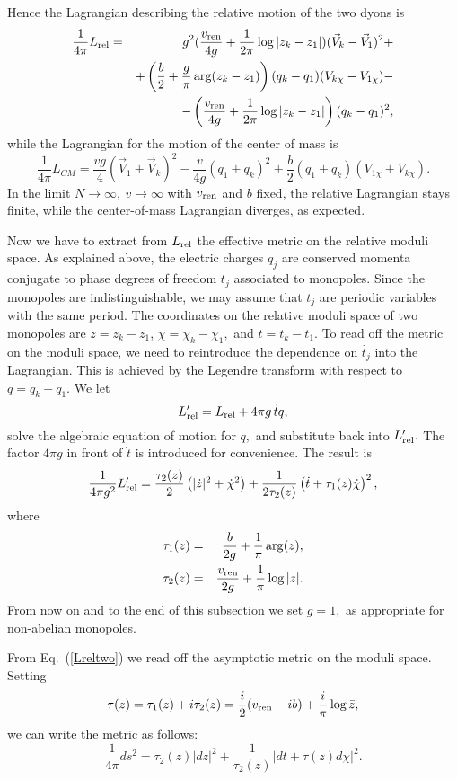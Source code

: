 \documentclass[a4paper,12pt, amsfonts, amssymb]{article}
\newcommand{\ra}{\rightarrow}
\newcommand{\V}{{\vec{V}}}
\newcommand{\nn}{\nonumber}
\newcommand{\bz}{{\bar z}}
\newcommand{\vr}{v_{{\rm ren}}}
\begin{document}
Hence the Lagrangian describing the relative motion of the two dyons is
\begin{eqnarray}\label{interaction}
\frac{1}{4\pi}L_{\rm rel}&=&g^2(\frac{\vr}{4g}+\frac{1}{2\pi}
\log|z_k-z_1|)(\V_k-\V_1)^2+\\
&&+\left(\frac{b}{2}+\frac{g}{\pi}\arg(z_k-z_1)\right)(q_k-q_1)
(V_{k\chi}-V_{1\chi})-\nn\\
&&-\left(\frac{\vr}{4g}+\frac{1}{2\pi}\log|z_k-z_1|\right)(q_k-q_1)^2,\nn
\end{eqnarray}
while the Lagrangian for the motion of the center of mass is
$$
\frac{1}{4\pi}L_{CM}=\frac{vg}{4}\left(\V_1+\V_k\right)^2-
\frac{v}{4g}\left(q_1+q_k\right)^2+\frac{b}{2}\left(q_1+q_k\right)
\left(V_{1\chi}+V_{k\chi}\right).
$$
In the limit $N\ra\infty,\ v\ra\infty$ with $\vr$ and $b$ fixed, the relative Lagrangian stays finite, while the center-of-mass Lagrangian diverges, as expected.

Now we have to extract from $L_{\rm rel}$ the effective metric on the
relative moduli space. As explained above, the electric charges $q_j$
are conserved momenta conjugate to phase degrees of freedom $t_j$ associated
to monopoles. Since the monopoles are indistinguishable, we may assume that
$t_j$ are periodic variables with the same period. The coordinates on the relative moduli space of two monopoles are $z=z_k-z_1$, $\chi=\chi_k-\chi_1,$ and $t=t_k-t_1.$ To read off the metric on the
moduli space, we need to reintroduce the dependence on $\dot{t_j}$ into
the Lagrangian. This is achieved by the Legendre transform with respect
to $q=q_k-q_1.$ We let
$$
L'_{\rm rel}=L_{\rm rel}+4\pi g\,\dot{t} q,
$$
solve the algebraic equation of motion for $q,$ and substitute back into
$L'_{\rm rel}.$ The factor $4\pi g$ in front of $\dot{t}$ is introduced
for convenience. The result is
\begin{equation}\label{Lreltwo}
\frac{1}{4\pi g^2}L'_{\rm rel}= \frac{\tau_2(z)}{2}\left(|\dot{z}|^2+\dot{\chi}^2\right)
+\frac{1}{2\tau_2(z)} \left(\dot{t}+\tau_1(z)\dot{\chi}\right)^2,
\end{equation}
where
\begin{eqnarray}
\tau_1(z)&=&\frac{b}{2g}+\frac{1}{\pi}\arg(z),\\
\tau_2(z)&=&\frac{\vr}{2g}+\frac{1}{\pi}\log|z|.
\end{eqnarray}
{}From now on and to the end of this subsection we set $g=1,$ as appropriate
for non-abelian monopoles.

{}From Eq.~(\ref{Lreltwo}) we read off the asymptotic
metric on the moduli space. Setting
\begin{equation}\label{tautwomon}
\tau(z)=\tau_1(z)+i\tau_2(z)=\frac{i}{2}(\vr-ib) + \frac{i}{\pi}\log\bz,
\end{equation}
we can write the metric as follows:
\begin{equation}\label{elliptic}
\frac{1}{4\pi} ds^2=\tau_2(z) |dz|^2+\frac{1}{\tau_2(z)}\left|dt+\tau(z)d\chi
\right|^2.
\end{equation}
\end{document}
